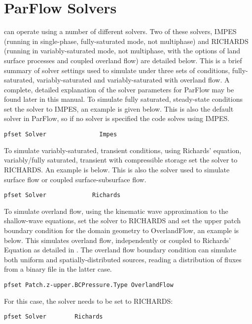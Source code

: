 \section{ParFlow Solvers}
\label{ParFlow Solvers}

\parflow{} can operate using a number of different solvers.  Two of these solvers, 
IMPES (running in single-phase, fully-saturated mode, not multiphase) and RICHARDS 
(running in variably-saturated mode, not multiphase, with the options of land surface
processes and coupled overland flow) are detailed below. 
This is a brief summary of solver settings used to simulate under three sets of conditions, fully-saturated,
variably-saturated and variably-saturated with overland flow.  A complete, detailed explanation of the 
solver parameters for ParFlow may be found later in this manual.
To simulate fully saturated, steady-state conditions set the solver to IMPES, an example is given below. 
This is also the default solver in ParFlow, so if no solver is specified the code solves using IMPES.

\begin{verbatim}
pfset Solver               Impes
\end{verbatim}

To simulate variably-saturated, transient conditions, using Richards' equation, 
variably/fully saturated, transient with compressible storage set the solver to RICHARDS.  
An example is below.  This is also the solver used to simulate surface flow or coupled 
surface-subsurface flow.

\begin{verbatim}
pfset Solver             Richards
\end{verbatim}

To simulate overland flow, using the kinematic wave approximation to the shallow-wave 
equations, set the solver to RICHARDS and set the upper patch boundary condition for the 
domain geometry to OverlandFlow, an example is below.  This simulates overland flow, independently 
or coupled to Richards' Equation as detailed in \cite{KM06}.  The overland flow boundary 
condition can simulate both uniform and spatially-distributed sources, reading a distribution of
fluxes from a binary file in the latter case. 
\begin{verbatim}
pfset Patch.z-upper.BCPressure.Type	OverlandFlow
\end{verbatim}

For this case, the solver needs to be set to RICHARDS: 
\begin{verbatim}
pfset Solver		Richards
\end{verbatim}

